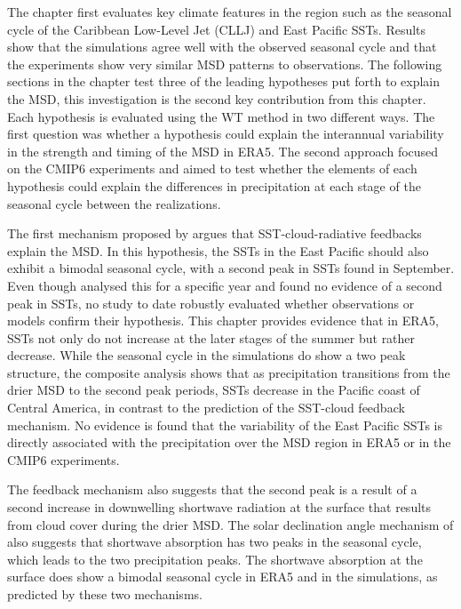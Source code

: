 The chapter first evaluates key climate features in the region such as the seasonal cycle of the Caribbean Low-Level Jet (CLLJ) and East Pacific SSTs. Results show that the simulations agree well with the observed seasonal cycle and that the experiments show very similar MSD patterns to observations. 
The following sections in the chapter test three of the leading hypotheses put forth to explain the MSD, this investigation is the second key contribution from this chapter.
 Each hypothesis is evaluated using the WT method in two different ways. The first question was whether a hypothesis could explain  the interannual variability in the strength and timing of the MSD  in ERA5. The second approach focused on the CMIP6 experiments and aimed to test whether the elements of each hypothesis could explain the differences in precipitation at each stage of the seasonal cycle between the realizations.
 
 The first mechanism proposed by \cite{magana1999} argues that SST-cloud-radiative feedbacks explain the MSD. In this hypothesis, the SSTs in the East Pacific should also exhibit a bimodal seasonal cycle, with a second peak in SSTs found in September. Even though \cite{magana2005} analysed this for a specific year and found no evidence of a second peak in SSTs, no study to date robustly evaluated whether observations or models confirm their hypothesis. This chapter provides evidence that in ERA5, SSTs not only do not increase at the later stages of the summer but rather decrease. While the seasonal cycle in the simulations do show a two peak structure, the composite analysis shows that as precipitation transitions from the drier MSD to the second peak periods, SSTs decrease in the Pacific coast of Central America, in contrast to the prediction of the SST-cloud feedback mechanism. No evidence is found that the variability of the East Pacific SSTs is directly associated with the precipitation over the MSD region in ERA5 or in the CMIP6 experiments. 

 
The feedback mechanism also suggests that the second peak is a result of a second increase in downwelling shortwave radiation at the surface that results from cloud cover during the drier MSD.
The solar declination angle mechanism of \cite{karnauskas2013} also suggests that shortwave absorption has two peaks in the seasonal cycle, which leads to the two precipitation peaks. The shortwave absorption at the surface does show a bimodal seasonal cycle in ERA5 and in the simulations, as predicted by these two mechanisms.

